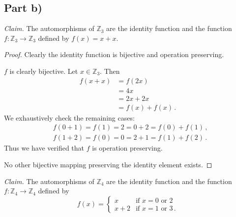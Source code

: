 \documentclass{abrice}
\newcommand{\Z}{\mathbb{Z}}
\newcommand{\Claim}{\emph{Claim.}\xspace}%
\begin{document}
\subsection{Part b)}

\Claim The automorphisms of $\Z_3$ are the identity function and the function $f : \Z_3
\to \Z_3$ defined by $f(x) = x + x$.

\begin{proof}
  Clearly the identity function is bijective and operation preserving.

  $f$ is clearly bijective. Let $x \in \Z_3$. Then
  \begin{align*}
    f(x + x)
    &= f(2x) \\
    &= 4x \\
    &= 2x + 2x \\
    &= f(x) + f(x)\, .
  \end{align*}
  We exhaustively check the remaining cases:
  \begin{align*}
    &f(0 + 1) = f(1) = 2 = 0 + 2 = f(0) + f(1)\, , \\
    & f(1 + 2) = f(0) = 0 = 2 + 1 = f(1) + f(2)\, .
  \end{align*}
  Thus we have verified that $f$ is operation preserving.

  No other bijective mapping preserving the identity element exists.
\end{proof}

\noindent
\Claim The automorphisms of $\Z_4$ are the identity function and the function $f
: \Z_4 \to \Z_4$ defined by
\[
  f(x) =
  \begin{cases}
    x &\text{if } x = 0 \text{ or } 2\\
    x + 2 &\text{if } x = 1 \text{ or } 3\, .
  \end{cases}
\]
\end{document}
